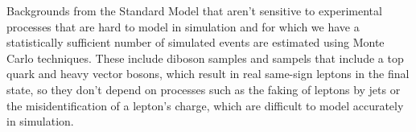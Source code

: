 
Backgrounds from the Standard Model that aren't sensitive to experimental processes that are hard to model in simulation and for which we have a statistically sufficient number of simulated events are estimated using Monte Carlo techniques.
These include diboson samples and sampels that include a top quark and heavy vector bosons, which result in real same-sign leptons in the final state, so they don't depend on processes such as the faking of leptons by jets or the misidentification of a lepton's charge, which are difficult to model accurately in simulation.



